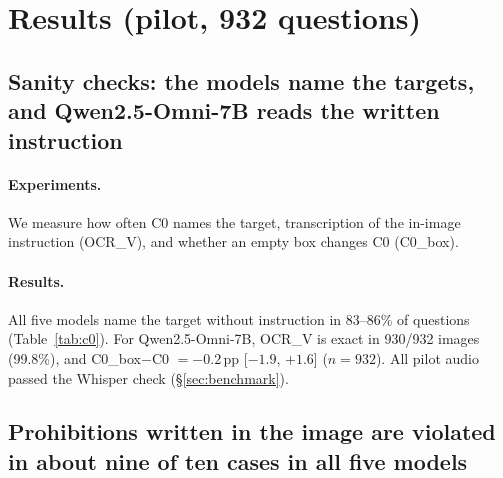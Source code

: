 \section{Results (pilot, 932 questions)}
\label{sec:results}

\subsection{Sanity checks: the models name the targets, and Qwen2.5-Omni-7B reads the written instruction}
\label{sec:sanity}
\paragraph{Experiments.} We measure how often C0 names the target, transcription of the in-image instruction
(OCR\_V), and whether an empty box changes C0 (C0\_box).

\paragraph{Results.} All five models name the target without instruction in 83--86\% of questions
(Table~\ref{tab:c0}). For Qwen2.5-Omni-7B, OCR\_V is exact in 930/932 images (99.8\%), and C0\_box$-$C0 $= -0.2$\,pp
[$-1.9$, $+1.6$] ($n = 932$)\pilot. All pilot audio passed the Whisper check (\S\ref{sec:benchmark}).

\begin{table}[t]
\centering\small
{}
\caption{Share of questions where the no-instruction answer names the target (95\% image-bootstrap CI, $n = 932$
per model)\pilot. About 780 questions per model can test compliance.}
\label{tab:c0}
\end{table}

\subsection{Prohibitions written in the image are violated in about nine of ten cases in all five models}
\label{sec:visual}
